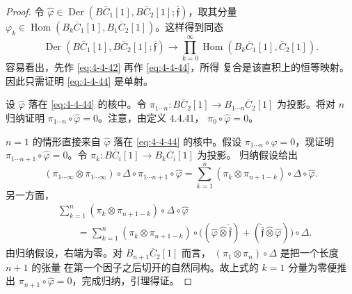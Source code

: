\begin{proof}
令 $\widehat\varphi\in
\operatorname{Der}(B\overline C_1[1],B\overline C_2[1];
\overline{\mathfrak f})$，取其分量
$\varphi_k\in\operatorname{Hom}
(B_k\overline C_1[1],B_1\overline C_2[1])$。这样得到同态
\begin{equation}
 \operatorname{Der}(B\overline C_1[1],B\overline C_2[1];
 \overline{\mathfrak f})
 \longrightarrow
 \prod_{k=0}^{\infty}
 \operatorname{Hom}(B_k\overline C_1[1],\overline C_2[1]).
\tag{4.4.44}\label{eq:4-4-44}
\end{equation}
容易看出，先作 \eqref{eq:4-4-42} 再作 \eqref{eq:4-4-44}，所得
复合是该直积上的恒等映射。因此只需证明 \eqref{eq:4-4-44} 是单射。

设 $\widehat\varphi$ 落在 \eqref{eq:4-4-44} 的核中。令
$\pi_{1\cdots n}\colon B\overline C_2[1]\to
B_{1\cdots n}\overline C_2[1]$ 为投影。将对 $n$ 归纳证明
$\pi_{1\cdots n}\circ\widehat\varphi=0$。注意，由定义 4.4.41，
$\pi_0\circ\widehat\varphi=0$。

$n=1$ 的情形直接来自 $\widehat\varphi$ 落在
\eqref{eq:4-4-44} 的核中。假设
$\pi_{1\cdots n}\circ\widehat\varphi=0$，现证明
$\pi_{1\cdots n+1}\circ\widehat\varphi=0$。令
$\pi_k\colon B\overline C_i[1]\to B_k\overline C_i[1]$ 为投影。
归纳假设给出
\begin{equation}
 (\pi_{1\cdots\infty}\otimes\pi_{1\cdots\infty})
 \circ\Delta\circ\pi_{1\cdots n+1}\circ\widehat\varphi
 =\sum_{k=1}^{n}(\pi_k\otimes\pi_{n+1-k})
 \circ\Delta\circ\widehat\varphi.
\tag{4.4.45}\label{eq:4-4-45}
\end{equation}
另一方面，
\[
 \begin{aligned}
 &\sum_{k=1}^{n}(\pi_k\otimes\pi_{n+1-k})
 \circ\Delta\circ\widehat\varphi\\
 &\qquad=
 \sum_{k=1}^{n}(\pi_k\otimes\pi_{n+1-k})\circ
 \bigl((\widehat\varphi\widehat\otimes
 \widehat{\overline{\mathfrak f}})
 +(\widehat{\overline{\mathfrak f}}\widehat\otimes
 \widehat\varphi)\bigr)\circ\Delta.
 \end{aligned}
\]
由归纳假设，右端为零。对 $B_{n+1}\overline C_2[1]$ 而言，
$(\pi_1\otimes\pi_n)\circ\Delta$ 是把一个长度 $n+1$ 的张量
在第一个因子之后切开的自然同构。故上式的 $k=1$ 分量为零便推出
$\pi_{n+1}\circ\widehat\varphi=0$，完成归纳，引理得证。
\end{proof}

